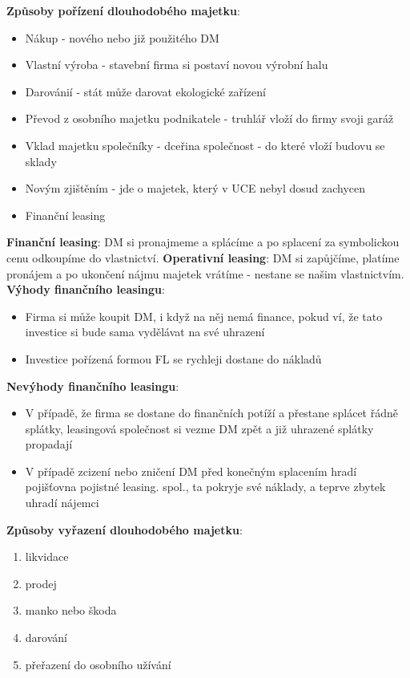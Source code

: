 \textbf{Způsoby pořízení dlouhodobého majetku}:
\begin{itemize}
    \item Nákup - nového nebo již použitého DM
    \item Vlastní výroba - stavební firma si postaví novou výrobní halu
    \item Darovánií - stát může darovat ekologické zařízení
    \item Převod z osobního majetku podnikatele - truhlář vloží do firmy svoji garáž
    \item Vklad majetku společníky - dceřina společnost - do které vloží budovu se sklady
    \item Novým zjištěním - jde o majetek, který v UCE nebyl dosud zachycen
    \item Finanční leasing
\end{itemize}

\textbf{Finanční leasing}: DM si pronajmeme a splácíme a po splacení za symbolickou cenu odkoupíme do vlastnictví.
\textbf{Operativní leasing}: DM si zapůjčíme, platíme pronájem a po ukončení nájmu majetek vrátíme - nestane se našim vlastnictvím.
\textbf{Výhody finančního leasingu}:
\begin{itemize}
    \item Firma si může koupit DM, i když na něj nemá finance, pokud ví, že tato investice si bude sama vydělávat na své uhrazení
    \item Investice pořízená formou FL se rychleji dostane do nákladů
\end{itemize}

\textbf{Nevýhody finančního leasingu}:
\begin{itemize}
    \item V případě, že firma se dostane do finančních potíží a přestane splácet řádně splátky, leasingová společnost si vezme DM zpět a již uhrazené splátky propadají
    \item V případě zcizení nebo zničení DM před konečným splacením hradí pojišťovna pojistné leasing. spol., ta pokryje své náklady, a teprve zbytek uhradí nájemci
\end{itemize}

\textbf{Způsoby vyřazení dlouhodobého majetku}:
\begin{enumerate}
    \item likvidace
    \item prodej
    \item manko nebo škoda
    \item darování
    \item přeřazení do osobního užívání
\end{enumerate}

